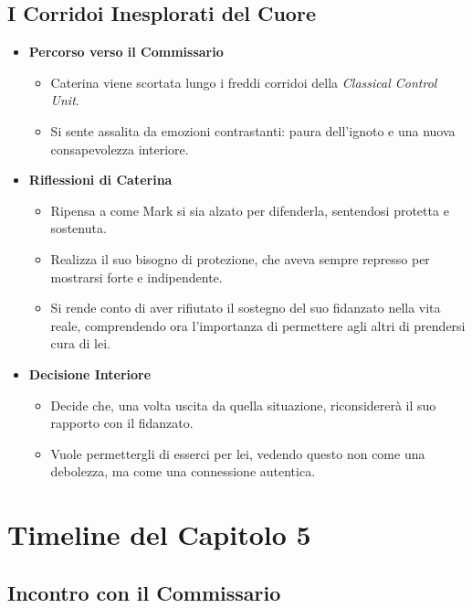 \subsection*{I Corridoi Inesplorati del Cuore}

\begin{itemize}
    \item \textbf{Percorso verso il Commissario}
    \begin{itemize}
        \item Caterina viene scortata lungo i freddi corridoi della \emph{Classical Control Unit}.
        \item Si sente assalita da emozioni contrastanti: paura dell'ignoto e una nuova consapevolezza interiore.
    \end{itemize}
    \item \textbf{Riflessioni di Caterina}
    \begin{itemize}
        \item Ripensa a come Mark si sia alzato per difenderla, sentendosi protetta e sostenuta.
        \item Realizza il suo bisogno di protezione, che aveva sempre represso per mostrarsi forte e indipendente.
        \item Si rende conto di aver rifiutato il sostegno del suo fidanzato nella vita reale, comprendendo ora l'importanza di permettere agli altri di prendersi cura di lei.
    \end{itemize}
    \item \textbf{Decisione Interiore}
    \begin{itemize}
        \item Decide che, una volta uscita da quella situazione, riconsidererà il suo rapporto con il fidanzato.
        \item Vuole permettergli di esserci per lei, vedendo questo non come una debolezza, ma come una connessione autentica.
    \end{itemize}
\end{itemize}

\section*{Timeline del Capitolo 5}

\subsection*{Incontro con il Commissario}

